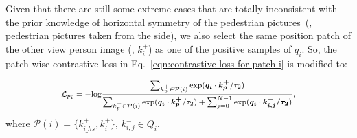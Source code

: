 \documentclass[10pt,twocolumn,letterpaper]{article}
\newcommand{\tcr}{\textcolor{red}}
\begin{document}

Given that there are still some extreme cases that are totally inconsistent with the prior knowledge of horizontal symmetry of the pedestrian pictures~(\eg, pedestrian pictures taken from the side), we also select the same position patch of the other view person image (\ie, $k^+_i$) as one of the positive samples of $q_i$. So, the patch-wise contrastive loss in Eq.~\ref{eqn:contrastive loss for patch i} is modified to:

\begin{equation}
\footnotesize
\label{eqn:contrastive loss for patch i with hard mining}
    \mathcal{L}_{p_i} = - \text{log}\frac{\sum_{k^+_p\in\mathcal{P}(i)}\text{exp}(\bm{q_i}\cdot\bm{k^+_p} / \tau_2)}{\sum_{k^+_p\in\mathcal{P}(i)}\text{exp}(\bm{q_i}\cdot\bm{k^+_p} / \tau_2) + \sum_{j=0}^{N-1} \text{exp}(\bm{q_i}\cdot\bm{k^-_{i,j}/\tau_2})},
\end{equation}
where $\mathcal{P}(i)=\{k^+_{i\_hs}, k^+_i\}$, $k^-_{i,j}\in Q_i$. 
\end{document}
